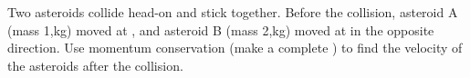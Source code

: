 \label{fnt7.1.1-7}

Two asteroids collide head-on and stick together. Before the collision, asteroid A (mass 1,\unit[000]{kg}) moved at , and asteroid B (mass 2,\unit[000]{kg}) moved at  in the opposite direction. Use momentum conservation (make a complete \pchart{}) to find the velocity of the asteroids after the collision.